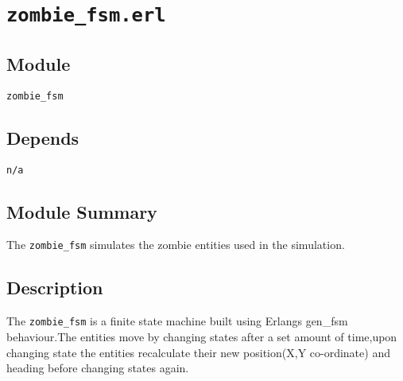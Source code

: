 \pagestyle{empty}
\section{\tt zombie\_fsm.erl}
\subsection{Module}
\verb+zombie_fsm+
\subsection{Depends}
{\tt n/a}
\subsection{Module Summary}
The \verb+zombie_fsm+ simulates the zombie entities used in the simulation.
\subsection{Description}
The \verb+zombie_fsm+ is a finite state machine built using Erlangs gen\_fsm behaviour.The entities move by changing states after a set amount of time,upon changing state the entities recalculate their new position(X,Y co-ordinate) and heading before changing states again. 
